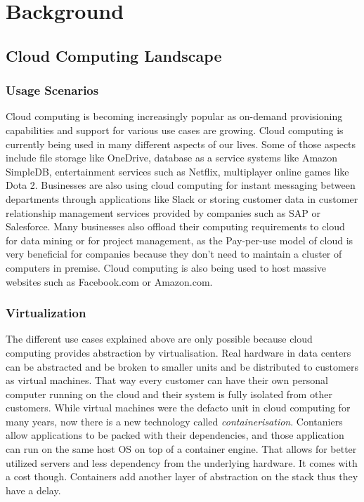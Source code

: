
\chapter{Background}\label{chapter:background} %

\section{Cloud Computing Landscape} %
\subsection{Usage Scenarios}
Cloud computing is becoming increasingly popular as on-demand provisioning capabilities and support for various use cases are growing. Cloud computing is currently being used in many different aspects of our lives. \cite{cloud-use-cases} Some of those aspects include file storage like OneDrive, database as a service systems like Amazon SimpleDB, entertainment services such as Netflix, multiplayer online games like Dota 2. Businesses are also using cloud computing for instant messaging between departments through applications like Slack or storing customer data in customer relationship management services provided by companies such as SAP or Salesforce. Many businesses also offload their computing requirements to cloud for data mining or for project management, as the Pay-per-use model of cloud is very beneficial for companies because they don't need to maintain a cluster of computers in premise. Cloud computing is also being used to host massive websites such as Facebook.com or Amazon.com.
\subsection{Virtualization}
The different use cases explained above are only possible because cloud computing provides abstraction by virtualisation. Real hardware in data centers can be abstracted and be broken to smaller units and be distributed to customers as virtual machines. That way every customer can have their own personal computer running on the cloud and their system is fully isolated from other customers. While virtual machines were the defacto unit in cloud computing for many years, now there is a new technology called \textit{containerisation}. Contaniers allow applications to be packed with their dependencies, and those application can run on the same host OS on top of a container engine. That allows for better utilized servers and less dependency from the underlying hardware. It comes with a cost though. Containers add another layer of abstraction on the stack thus they have a delay. 

